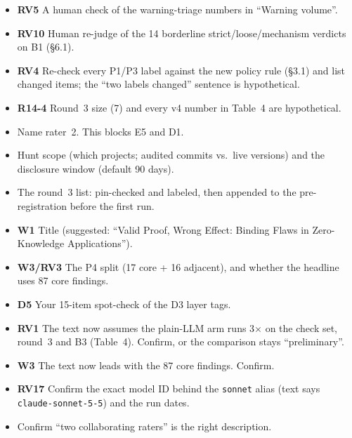 {\begin{itemize}
\begin{itemize}
  \item static tools on round~2 (E8);
  \item false alarms on clean B2 hosts (E10);
  \item vacuous Mythril runs (E13);
  \item honest-path check on two B2 hosts (E9).
  \end{itemize}
\item \textbf{RV5} A human check of the warning-triage numbers in ``Warning
volume''.
\item \textbf{RV10} Human re-judge of the 14 borderline strict/loose/mechanism
verdicts on B1 (\S6.1).
\item \textbf{RV4} Re-check every P1/P3 label against the new policy rule
(\S3.1) and list changed items; the ``two labels changed'' sentence is
hypothetical.
\item \textbf{R14-4} Round~3 size (7) and every v4 number in Table~4 are
hypothetical.
\end{itemize}

\begin{itemize}\setlength\itemsep{0pt}
\item Name rater~2. This blocks E5 and D1.
\item Hunt scope (which projects; audited commits vs.\ live versions) and the
disclosure window (default 90 days).
\item The round~3 list: pin-checked and labeled, then appended to the
pre-registration before the first run.
\item \textbf{W1} Title (suggested: ``Valid Proof, Wrong Effect: Binding Flaws
in Zero-Knowledge Applications'').
\item \textbf{W3/RV3} The P4 split (17 core + 16 adjacent), and whether the
headline uses 87 core findings.
\item \textbf{D5} Your 15-item spot-check of the D3 layer tags.
\item \textbf{RV1} The text now assumes the plain-LLM arm runs 3$\times$ on
the check set, round~3 and B3 (Table~4). Confirm, or the comparison stays
``preliminary''.
\item \textbf{W3} The text now leads with the 87 core findings. Confirm.
\item \textbf{RV17} Confirm the exact model ID behind the \texttt{sonnet}
alias (text says \texttt{claude-sonnet-5-5}) and the run dates.
\item Confirm ``two collaborating raters'' is the right description.
\end{itemize}

}
